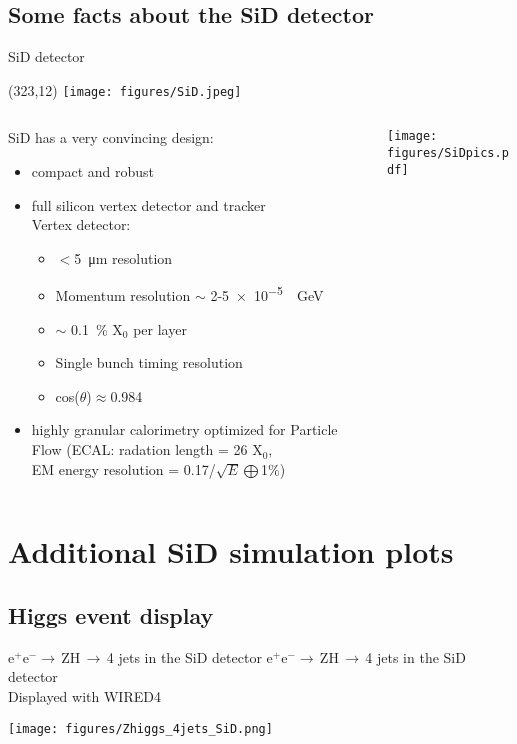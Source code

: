 \documentclass[xcolor={dvipsnames}]{beamer}
\newcommand{\sidlogo}{
  \setlength{\TPHorizModule}{1pt}
  \setlength{\TPVertModule}{1pt}
  \begin{textblock}{1}(323,12)
   \texttt{[image: figures/SiD.jpeg]}
  \end{textblock}
  }
\begin{document}
\subsection{Some facts about the SiD detector}
\begin{frame}{SiD detector}
\sidlogo
 \begin{columns}
  \begin{column}{0.7\textwidth}
    SiD has a very convincing design:
 \begin{itemize}
  \item compact and robust
  \item full silicon vertex detector and tracker\\
  Vertex detector:
  \begin{itemize}
   \item $<$\SI{5}{\micro\metre} resolution
   \item Momentum resolution $\sim$ 2-\SI{5e-5}{\per\giga\electronvolt}
   \item $\sim$ \SI{0.1}{\percent} X$_0$ per layer
    \item Single bunch timing resolution
    \item cos($\theta$)$\approx$0.984
  \end{itemize}
  \item highly granular calorimetry optimized for Particle Flow (ECAL: radation length = 26 X$_0$, \\EM energy resolution = 0.17/$\sqrt{E}\bigoplus$1\%)
 \end{itemize}
  \end{column}
  \begin{column}{0.3\textwidth}
    \begin{flushright}
  \texttt{[image: figures/SiDpics.pdf]}
 \end{flushright}
  \end{column}
 \end{columns}

\end{frame}

\section{Additional SiD simulation plots}

\subsection{Higgs event display}
\begin{frame}[label=ZH_event_display]{e$^+$e$^-\rightarrow$\,ZH\,$\rightarrow$\,4 jets in the SiD detector}
e$^+$e$^-\rightarrow$\,ZH\,$\rightarrow$\,4 jets in the SiD detector\\
Displayed with WIRED4
 \begin{center}
   \texttt{[image: figures/Zhiggs\_4jets\_SiD.png]}\\
 \hyperlink{HitsEcalEndcaps}{}
 \end{center}
\end{frame}
\end{document}
